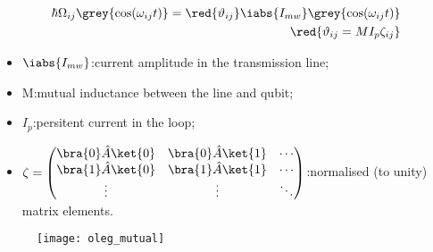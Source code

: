 \begin{minipage}[r]{0.5\textwidth}
  \begin{framed}\noindent

    \begin{equation}\label{eq:couple7}
      \begin{aligned}
        \hbar\Omega_{ij}\grey{\cos(\omega_{ij} t)} = \red{\vartheta_{ij}}\iabs{I_{mw}}\grey{\cos(\omega_{ij} t)}&  \\
        \red{\vartheta_{ij} = MI_p\zeta_{ij}} &
      \end{aligned}
    \end{equation}

    \begin{itemize}
    \item $ \iabs{I_{mw}} $:\hfill current amplitude in the transmission line;
    \item M:\hfill mutual inductance between the line and qubit;
    \item $ I_p $:\hfill persitent current in the loop;
    \item $ \zeta = \begin{pmatrix}
        \bra{0}\hat{A}\ket{0} & \bra{0}\hat{A}\ket{1} & \cdots\\
        \bra{1}\hat{A}\ket{0} & \bra{1}\hat{A}\ket{1} & \cdots\\
        \vdots & \vdots & \ddots
      \end{pmatrix} $:\hfill normalised (to unity) matrix elements.
    \end{itemize}

  \end{framed}
\end{minipage}
\begin{figure}[h]
  \centering \texttt{[image: oleg\_mutual]}
\end{figure}

\noindent

\newpage

